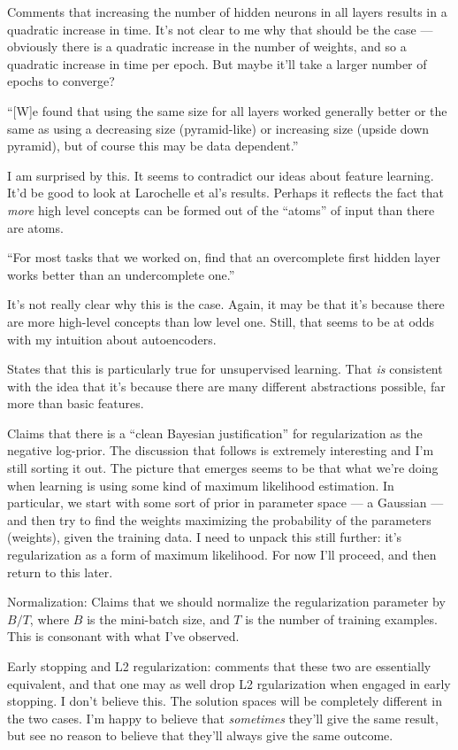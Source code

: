 \documentclass[12pt]{report}
\begin{document}
Comments that increasing the number of hidden neurons in all layers
results in a quadratic increase in time.  It's not clear to me why
that should be the case --- obviously there is a quadratic increase in
the number of weights, and so a quadratic increase in time per epoch.
But maybe it'll take a larger number of epochs to converge?

``[W]e found that using the same size for all layers worked generally
better or the same as using a decreasing size (pyramid-like) or
increasing size (upside down pyramid), but of course this may be data
dependent.''

I am surprised by this.  It seems to contradict our ideas about
feature learning.  It'd be good to look at Larochelle et al's results.
Perhaps it reflects the fact that \emph{more} high level concepts can
be formed out of the ``atoms'' of input than there are atoms.

``For most tasks that we worked on, find that an overcomplete first
hidden layer works better than an undercomplete one.''

It's not really clear why this is the case.  Again, it may be that
it's because there are more high-level concepts than low level one.
Still, that seems to be at odds with my intuition about autoencoders.

States that this is particularly true for unsupervised learning.  That
\emph{is} consistent with the idea that it's because there are many
different abstractions possible, far more than basic features.

Claims that there is a ``clean Bayesian justification'' for
regularization as the negative log-prior.  The discussion that follows
is extremely interesting and I'm still sorting it out.  The picture
that emerges seems to be that what we're doing when learning is using
some kind of maximum likelihood estimation.  In particular, we start
with some sort of prior in parameter space --- a Gaussian --- and then
try to find the weights maximizing the probability of the parameters
(weights), given the training data.  I need to unpack this still
further: it's regularization as a form of maximum likelihood.  For now
I'll proceed, and then return to this later.

Normalization: Claims that we should normalize the regularization
parameter by $B / T$, where $B$ is the mini-batch size, and $T$ is the
number of training examples.  This is consonant with what I've
observed.

Early stopping and L2 regularization: comments that these two are
essentially equivalent, and that one may as well drop L2 rgularization
when engaged in early stopping.  I don't believe this.  The solution
spaces will be completely different in the two cases.  I'm happy to
believe that \emph{sometimes} they'll give the same result, but see no
reason to believe that they'll always give the same outcome.
\end{document}

